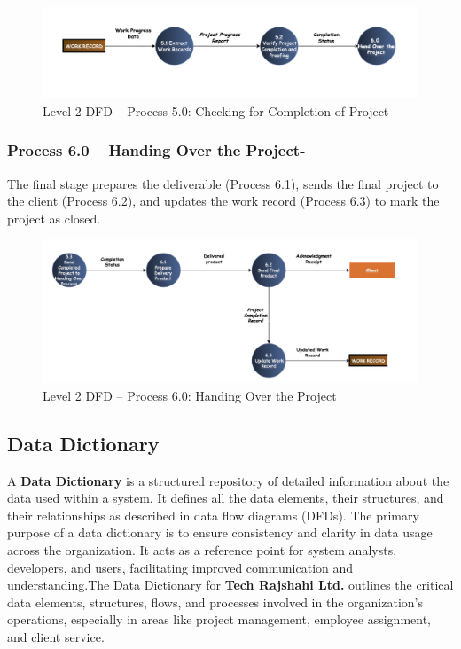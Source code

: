 \documentclass[12pt,a4paper]{article}
\begin{document}
\begin{figure}[H]
    \centering
    \includegraphics[width=\textwidth]{Fig/process5_dfd.png}
    \caption{Level 2 DFD – Process 5.0: Checking for Completion of Project}
    \label{fig:level2_process5}
\end{figure}

\newpage
\subsubsection*{Process 6.0 – Handing Over the Project-}
\noindent
The final stage prepares the deliverable (Process 6.1), sends the final project to the client (Process 6.2), and updates the work record (Process 6.3) to mark the project as closed.

\begin{figure}[H]
    \centering
    \includegraphics[width=\textwidth]{Fig/process6_dfd.png}
    \caption{Level 2 DFD – Process 6.0: Handing Over the Project}
    \label{fig:level2_process6}
\end{figure}

\vspace{2cm}
\subsection{Data Dictionary}

A \textbf{Data Dictionary} is a structured repository of detailed information about the data used within a system. It defines all the data elements, their structures, and their relationships as described in data flow diagrams (DFDs). The primary purpose of a data dictionary is to ensure consistency and clarity in data usage across the organization. It acts as a reference point for system analysts, developers, and users, facilitating improved communication and understanding.The Data Dictionary for \textbf{Tech Rajshahi Ltd.} outlines the critical data elements, structures, flows, and processes involved in the organization’s operations, especially in areas like project management, employee assignment, and client service.
\end{document}
